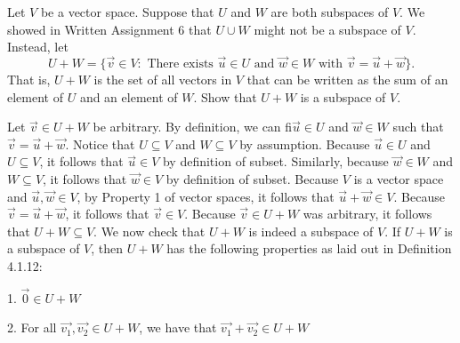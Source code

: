 \documentclass[12pt]{article}
\newenvironment{problem}[2][Problem]
{
	\begin{trivlist} 
		\item[\hskip \labelsep {\bfseries #1 #2:}]
	}
{
	\end{trivlist}
	}
\newenvironment{solution}[1][Solution]
{
	\begin{trivlist} 
		\item[\hskip \labelsep {\itshape #1:}]
	}
	{
	\end{trivlist}
}
\begin{document}
\newpage
\begin{problem}{3}
Let $V$ be a vector space. Suppose that $U$ and $W$ are both subspaces of $V$. We showed in Written Assignment 6 that $U \cup W$ might not be a subspace of $V$. Instead, let
\[
U+W=\{ \vec{v} \in V: \text{ There exists } \vec{u} \in U \text{ and } \vec{w} \in W \text{ with } \vec{v} = \vec{u} + \vec{w} \} \text{.}
\]
That is, $U +W$ is the set of all vectors in $V$ that can be written as the sum of an element of $U$ and an element of $W$. Show that $U+W$ is a subspace of $V$.
\noindent
\newline
\newline
\begin{solution}
Let $\vec{v} \in U+W$ be arbitrary. By definition, we can fi$\vec{u} \in U$ and $\vec{w} \in W$ such that $\vec{v} = \vec{u} + \vec{w}$. Notice that $U \subseteq V$ and $W \subseteq V$ by assumption. Because $\vec{u} \in U$ and $U \subseteq V$, it follows that $\vec{u} \in V$ by definition of subset. Similarly, because $\vec{w} \in W$ and $W \subseteq V$, it follows that $\vec{w} \in V$ by definition of subset. Because $V$ is a vector space and $\vec{u},\vec{w} \in V$, by Property 1 of vector spaces, it follows that $\vec{u} + \vec{w} \in V$. Because $\vec{v} = \vec{u} +\vec{w}$, it follows that $\vec{v} \in V$. Because $\vec{v} \in U+W$ was arbitrary, it follows that $U+W \subseteq V$.
We now check that $U+W$ is indeed a subspace of $V$. If $U+W$ is a subspace of $V$, then $U+W$ has the following properties as laid out in Definition 4.1.12:

1. $\vec{0} \in U+W$

2. For all $\vec{v_1},\vec{v_2} \in U+W$, we have that $\vec{v_1}+\vec{v_2} \in U+W$


\end{solution}
\end{problem}
\end{document}
